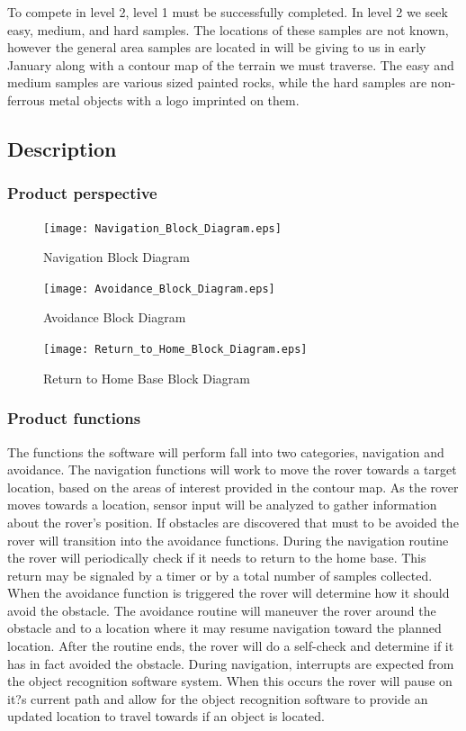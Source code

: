 \documentclass[10pt, oneside,onecolumn]{IEEEtran}
\begin{document}
To compete in level 2, level 1 must be successfully completed. In level 2 we seek easy, medium, and hard samples. The locations of these samples are not known, however the general area samples are located in will be giving to us in early January along with a contour map of the terrain we must traverse. The easy and medium samples are various sized painted rocks, while the hard samples are non-ferrous metal objects with a logo imprinted on them. 

\subsection{Description}
\subsubsection{Product perspective}

\begin{figure}[H]
\centering
\texttt{[image: Navigation\_Block\_Diagram.eps]}
\caption{Navigation Block Diagram}
\end{figure}

\begin{figure}[H]
\centering
\texttt{[image: Avoidance\_Block\_Diagram.eps]}
\caption{Avoidance Block Diagram}
\end{figure}

\begin{figure}[H]
\centering
\texttt{[image: Return\_to\_Home\_Block\_Diagram.eps]}
\caption{Return to Home Base Block Diagram}
\end{figure}

\subsubsection{Product functions}
	The functions the software will perform fall into two categories, navigation and avoidance. The navigation functions will work to move the rover towards a target location, based on the areas of interest provided in the contour map. As the rover moves towards a location, sensor input will be analyzed to gather information about the rover's position. If obstacles are discovered that must to be avoided the rover will transition into the avoidance functions. During the navigation routine the rover will periodically check if it needs to return to the home base. This return may be signaled by a timer or by a total number of samples collected.  
	When the avoidance function is triggered the rover will determine how it should avoid the obstacle. The avoidance routine will maneuver the rover around the obstacle and to a location where it may resume navigation toward the planned location. After the routine ends, the rover will do a self-check and determine if it has in fact avoided the obstacle. During navigation, interrupts are expected from the object recognition software system. When this occurs the rover will pause on it?s current path and allow for the object recognition software to provide an updated location to travel towards if an object is located. 
\end{document}

